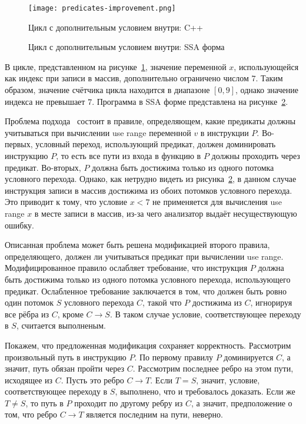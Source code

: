 \begin{figure}
    \texttt{[image: predicates-improvement.png]}
    \caption{Цикл с дополнительным условием внутри: C++}
    \label{fig:predicates-improvement-cpp}
\end{figure}

\begin{figure}
    \caption{Цикл с дополнительным условием внутри: SSA форма}
    \label{fig:predicates-improvement-ssa}
\end{figure}

В цикле, представленном на
рисунке~\ref{fig:predicates-improvement-cpp}, значение переменной $x$,
использующейся как индекс при записи в массив, дополнительно
ограничено числом $7$. Таким образом, значение счётчика цикла
находится в диапазоне $[0, 9]$, однако значение индекса не превышает
$7$. Программа в SSA форме представлена на
рисунке~\ref{fig:predicates-improvement-ssa}.

Проблема подхода~\cite{li2010practical} состоит в правиле,
определяющем, какие предикаты должны учитываться при вычислении use
range переменной $v$ в инструкции $P$. Во-первых, условный переход,
использующий предикат, должен доминировать инструкцию $P$, то есть все
пути из входа в функцию в $P$ должны проходить через
предикат. Во-вторых, $P$ должна быть достижима только из одного
потомка условного перехода. Однако, как нетрудно видеть из
рисунка~\ref{fig:predicates-improvement-ssa}, в данном случае
инструкция записи в массив достижима из обоих потомков условного
перехода. Это приводит к тому, что условие $x < 7$ не применяется для
вычисления use range $x$ в месте записи в массив, из-за чего
анализатор выдаёт несуществующую ошибку.

Описанная проблема может быть решена модификацией второго правила,
определяющего, должен ли учитываться предикат при вычислении use
range. Модифицированное правило ослабляет требование, что инструкция
$P$ должна быть достижима только из одного потомка условного перехода,
использующего предикат. Ослабленное требование заключается в том, что
должен быть ровно один потомок $S$ условного перехода $C$, такой что
$P$ достижима из $C$, игнорируя все рёбра из $C$, кроме
$C \rightarrow S$. В таком случае условие, соответствующее переходу в
$S$, считается выполненым.

Покажем, что предложенная модификация сохраняет
корректность. Рассмотрим произвольный путь в инструкцию $P$. По
первому правилу $P$ доминируется $C$, а значит, путь обязан пройти
через $C$. Рассмотрим последнее ребро на этом пути, исходящее из
$C$. Пусть это ребро $C \rightarrow T$. Если $T = S$, значит, условие,
соответствующее переходу в $S$, выполнено, что и требовалось
доказать. Если же $T \neq S$, то путь в $P$ проходит по другому ребру
из $C$, а значит, предположение о том, что ребро $C \rightarrow T$
является последним на пути, неверно.

